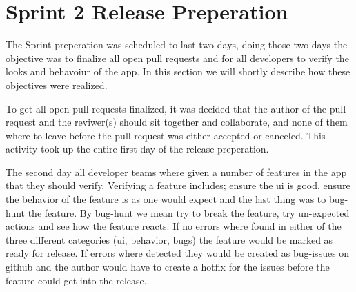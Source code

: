 \section{Sprint 2 Release Preperation}
The Sprint preperation was scheduled to last two days, doing those two days the objective was to finalize all open pull requests and for all developers to verify the looks and behavoiur of the app. In this section we will shortly describe how these objectives were realized.

To get all open pull requests finalized, it was decided that the author of the pull request and the reviwer(s) should sit together and collaborate, and none of them where to leave before the pull request was either accepted or canceled. This activity took up the entire first day of the release preperation.

The second day all developer teams where given a number of features in the app that they should verify. Verifying a feature includes; ensure the \gls{ui} is good, ensure the behavior of the feature is as one would expect and the last thing was to bug-hunt the feature. By bug-hunt we mean try to break the feature, try un-expected actions and see how the feature reacts. If no errors where found in either of the three different categories (\gls{ui}, behavior, bugs) the feature would be marked as ready for release. If errors where detected they would be created as bug-issues on github and the author would have to create a hotfix for the issues before the feature could get into the release.
